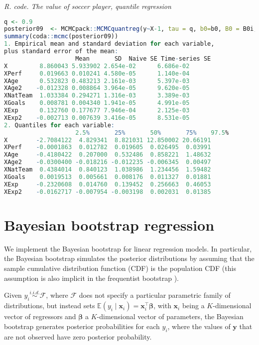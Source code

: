 \begin{tcolorbox}[enhanced,width=4.67in,center upper,
	fontupper=\large\bfseries,drop shadow southwest,sharp corners]
	\textit{R. code. The value of soccer player, quantile regression}
	\begin{VF}
		\begin{lstlisting}[language=R]
q <- 0.9
posterior09  <- MCMCpack::MCMCquantreg(y~X-1, tau = q, b0=b0, B0 = B0i, burnin = burnin, mcmc = mcmc, thin = thin, below = 13.82, above = Inf)
summary(coda::mcmc(posterior09))
1. Empirical mean and standard deviation for each variable,
plus standard error of the mean:
					Mean       SD  Naive SE Time-series SE
X         8.860043 5.933902 2.654e-02      6.686e-02
XPerf     0.019663 0.010241 4.580e-05      1.140e-04
XAge      0.532823 0.483213 2.161e-03      5.397e-03
XAge2    -0.012328 0.008864 3.964e-05      9.620e-05
XNatTeam  1.033384 0.294271 1.316e-03      3.389e-03
XGoals    0.008781 0.004340 1.941e-05      4.991e-05
XExp      0.132760 0.177677 7.946e-04      2.125e-03
XExp2    -0.002713 0.007639 3.416e-05      8.531e-05
2. Quantiles for each variable:
					2.5%       25%       50%       75%    97.5%
X        -2.7084122  4.829341  8.821031 12.850002 20.66191
XPerf    -0.0001863  0.012782  0.019605  0.026495  0.03991
XAge     -0.4180422  0.207000  0.532486  0.858221  1.48632
XAge2    -0.0300400 -0.018216 -0.012235 -0.006345  0.00497
XNatTeam  0.4384014  0.840123  1.038986  1.234456  1.59482
XGoals    0.0019513  0.005661  0.008176  0.011327  0.01881
XExp     -0.2320608  0.014760  0.139452  0.256663  0.46053
XExp2    -0.0162717 -0.007954 -0.003198  0.002031  0.01385
\end{lstlisting}
	\end{VF}
\end{tcolorbox} 

\section{Bayesian bootstrap regression}\label{sec610}

We implement the Bayesian bootstrap \cite{Rubin1981} for linear regression models. In particular, the Bayesian bootstrap simulates the posterior distributions by assuming that the sample cumulative distribution function (CDF) is the population CDF (this assumption is also implicit in the frequentist bootstrap \cite{Efron1979}).

Given $y_i \stackrel{i.i.d.}{\sim} \mathcal{F}$, where $\mathcal{F}$ does not specify a particular parametric family of distributions, but instead sets $\mathbb{E}(y_i \mid \bm{x}_i) = \bm{x}_i^{\top} \bm{\beta}$, with $\bm{x}_i$ being a $K$-dimensional vector of regressors and $\bm{\beta}$ a $K$-dimensional vector of parameters, the Bayesian bootstrap generates posterior probabilities for each $y_i$, where the values of $\bm{y}$ that are not observed have zero posterior probability.


